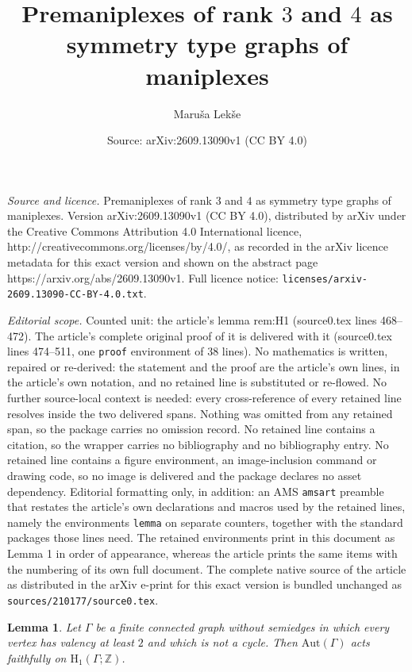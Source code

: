 \documentclass[10pt,a4paper]{amsart}
\title{Premaniplexes of rank $3$ and $4$ as symmetry type graphs of maniplexes}
\author{Maru\v{s}a Lek\v{s}e}
\date{Source: arXiv:2609.13090v1 (CC BY 4.0)}
\newtheorem{lemma}{Lemma}
\newcommand{\Aut}{\mathrm{Aut}}
\newcommand{\ZZ}{\mathbb{Z}}
\begin{document}
\maketitle

\noindent\emph{Source and licence.} Premaniplexes of rank $3$ and $4$ as symmetry type graphs of maniplexes. Version arXiv:2609.13090v1 (CC BY 4.0), distributed by arXiv under the Creative Commons Attribution 4.0 International licence, http://creativecommons.org/licenses/by/4.0/, as recorded in the arXiv licence metadata for this exact version and shown on the abstract page https://arxiv.org/abs/2609.13090v1. Full licence notice: \texttt{licenses/arxiv-2609.13090-CC-BY-4.0.txt}.\par\smallskip

\noindent\textit{Editorial scope.} Counted unit: the article's lemma rem:H1 (source0.tex lines 468--472). The article's complete original proof of it is delivered with it (source0.tex lines 474--511, one \texttt{proof} environment of 38 lines). No mathematics is written, repaired or re-derived: the statement and the proof are the article's own lines, in the article's own notation, and no retained line is substituted or re-flowed.  No further source-local context is needed: every cross-reference of every retained line resolves inside the two delivered spans.  Nothing was omitted from any retained span, so the package carries no omission record.  No retained line contains a citation, so the wrapper carries no bibliography and no bibliography entry.  No retained line contains a figure environment, an image-inclusion command or drawing code, so no image is delivered and the package declares no asset dependency.  Editorial formatting only, in addition: an AMS \texttt{amsart} preamble that restates the article's own declarations and macros used by the retained lines, namely the environments \texttt{lemma} on separate counters, together with the standard packages those lines need.  The retained environments print in this document as Lemma 1 in order of appearance, whereas the article prints the same items with the numbering of its own full document.  The complete native source of the article as distributed in the arXiv e-print for this exact version is bundled unchanged as \texttt{sources/210177/source0.tex}.
\begin{lemma}\label{rem:H1}
	Let $\Gamma$ be a finite connected graph without semiedges in which every vertex has
	valency at least $2$ and which is not a cycle. Then $\Aut(\Gamma)$ acts faithfully on
	$\mathrm{H}_1(\Gamma;\ZZ)$.
\end{lemma}
\end{document}
